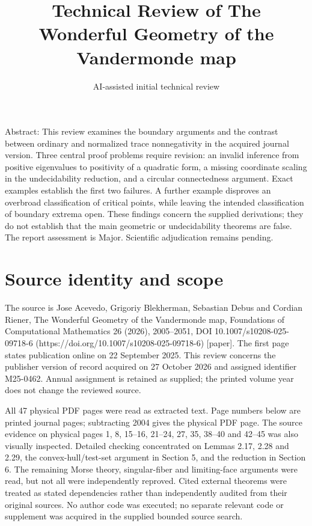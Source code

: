 \documentclass[10pt]{article}
\title{Technical Review of
The Wonderful Geometry of the Vandermonde map}
\author{AI-assisted initial technical review}
\date{}
\begin{document}
\maketitle
Abstract: This review examines the boundary arguments and the contrast between ordinary and normalized trace nonnegativity in the acquired journal version. Three central proof problems require revision: an invalid inference from positive eigenvalues to positivity of a quadratic form, a missing coordinate scaling in the undecidability reduction, and a circular connectedness argument. Exact examples establish the first two failures. A further example disproves an overbroad classification of critical points, while leaving the intended classification of boundary extrema open. These findings concern the supplied derivations; they do not establish that the main geometric or undecidability theorems are false. The report assessment is Major. Scientific adjudication remains pending.\par
\section*{Source identity and scope}
The source is Jose Acevedo, Grigoriy Blekherman, Sebastian Debus and Cordian Riener, The Wonderful Geometry of the Vandermonde map, Foundations of Computational Mathematics 26 (2026), 2005–2051, DOI 10.1007/s10208-025-09718-6 (https://doi.org/10.1007/s10208-025-09718-6) [paper]. The first page states publication online on 22 September 2025. This review concerns the publisher version of record acquired on 27 October 2026 and assigned identifier M25-0462. Annual assignment is retained as supplied; the printed volume year does not change the reviewed source.\par
All 47 physical PDF pages were read as extracted text. Page numbers below are printed journal pages; subtracting 2004 gives the physical PDF page. The source evidence on physical pages 1, 8, 15–16, 21–24, 27, 35, 38–40 and 42–45 was also visually inspected. Detailed checking concentrated on Lemmas 2.17, 2.28 and 2.29, the convex-hull/test-set argument in Section 5, and the reduction in Section 6. The remaining Morse theory, singular-fiber and limiting-face arguments were read, but not all were independently reproved. Cited external theorems were treated as stated dependencies rather than independently audited from their original sources. No author code was executed; no separate relevant code or supplement was acquired in the supplied bounded source search.\par
\end{document}
